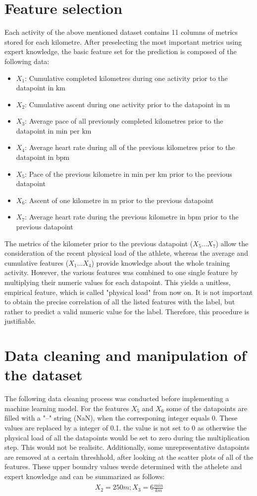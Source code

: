 \documentclass[11pt]{article}
\begin{document}
\section{Feature selection}
Each activity of the above mentioned dataset contains 11 columns of metrics stored for each kilometre. After preselecting the most important metrics using expert knowledge, the basic feature set for the prediction is composed of the following data:
\begin{itemize}
  \itemsep0pt
  \item ${X_1}$: Cumulative completed kilometres during one activity prior to the datapoint in km
  \item ${X_2}$: Cumulative ascent during one activity prior to the datapoint in m
  \item ${X_3}$: Average pace of all previously completed kilometres prior to the datapoint in min per km
  \item ${X_4}$: Average heart rate during all of the previous kilometres prior to the datapoint in bpm
  \item ${X_5}$: Pace of the previous kilometre in min per km prior to the previous datapoint
  \item ${X_6}$: Ascent of one kilometre in m prior to the previous datapoint
  \item ${X_7}$: Average heart rate during the previous kilometre in bpm  prior to the previous datapoint
\end{itemize}

The metrics of the kilometer prior to the previous datapoint ($X_5 ... X_7$) allow the consideration of the recent physical load of the athlete, whereas the average and cumulative features ($X_1 ... X_4$) provide knowledge about the whole training activity.
However, the various features was combined to one single feature by multiplying their numeric values for each datapoint. This yields a unitless, empirical feature, which is called "physical load" from now on.  It is not important to obtain the precise correlation of all the listed features with the label, but rather to predict a valid numeric value for the label. Therefore, this procedure is justifiable.\\

\section{Data cleaning and manipulation of the dataset}
The following  data cleaning process was conducted before implementing a machine learning model.
For the features $X_5$ and $X_6$ some of the datapoints are filled with a "--" string (NaN), when the corresponing integer equals 0. These values are replaced by a integer of 0.1. the value is not set to 0 as otherwise the physical load of all the datapoints would be set to zero during the multiplication step. This would not be realisitc.
Additionally, some unrepresentative datapoints are removed at a certain threshhold, after looking at the scatter plots of all of the features. These upper boundry values werde determined with the athelete and expert knowledge and can be summarized as follows:
 \begin{align}
	 X_2 = 250 m; X_3 = 6 \frac{min}{km}
\end{align}
\end{document}
